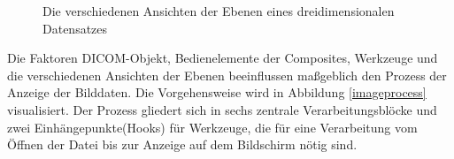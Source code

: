 \begin{figure}[htb]
\centering
{}
\caption{Die verschiedenen Ansichten der Ebenen eines dreidimensionalen Datensatzes}
\label{layers}
\end{figure}

Die Faktoren DICOM-Objekt, Bedienelemente der Composites, Werkzeuge und die verschiedenen Ansichten der Ebenen beeinflussen maßgeblich den Prozess der Anzeige der Bilddaten. Die Vorgehensweise wird in Abbildung \ref{imageprocess} visualisiert. Der Prozess gliedert sich in sechs zentrale Verarbeitungsblöcke und zwei Einhängepunkte(Hooks) für Werkzeuge, die für eine Verarbeitung vom Öffnen der Datei bis zur Anzeige auf dem Bildschirm nötig sind.

